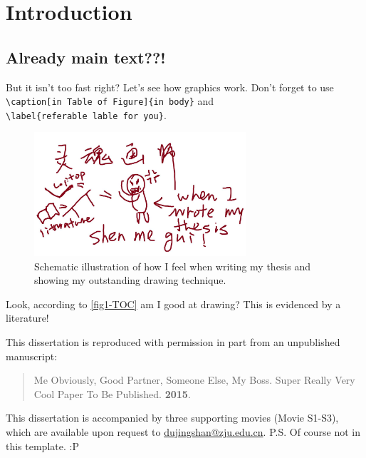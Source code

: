 \chapter{Introduction}
\section{Already main text??!}

But it isn't too fast right? Let's see how graphics work. Don't forget to use\\ \verb|\caption[in Table of Figure]{in body}| and\\ \verb|\label{referable lable for you}|.

\begin{figure}
	\centering\includegraphics[width=0.7\textwidth]{figure/1-TOC.pdf}
	\caption[Schematic illustration of how I feel when writing my thesis]{Schematic illustration of how I feel when writing my thesis and showing my outstanding drawing technique.}\label{fig1-TOC}
\end{figure}

Look, according to \autoref{fig1-TOC} am I good at drawing? This is evidenced by a literature!\cite{mywork}

This dissertation is reproduced with permission in part from an unpublished manuscript: 
\begin{quote}
	Me Obviously, Good Partner, Someone Else, My Boss. Super Really Very Cool Paper To Be Published. \textbf{2015}.
\end{quote} 

This dissertation is accompanied by three supporting movies (Movie S1-S3), which are available upon request to \href{mailto:dujingshan@zju.edu.cn}{dujingshan@zju.edu.cn}. P.S. Of course not in this template. :P